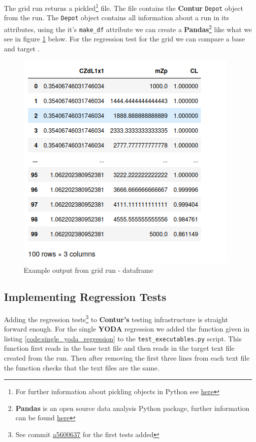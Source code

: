 The grid run returns a pickled\footnote{For further information about pickling objects in Python see \href{https://docs.python.org/3/library/pickle.html}{here}}  file. The  file contains the \textbf{Contur} \texttt{Depot} object from the run. The \texttt{Depot} object contains all information about a run in its attributes, using the it's \texttt{make\_df} attribute we can create a \textbf{Pandas}\footnote{\textbf{Pandas} is an open source data analysis Python package, further information can be found \href{https://pandas.pydata.org}{here} }  like what we see in figure \ref{fig:contur_df_output} below. For the regression test for the grid we can compare a base and target .

\begin{figure}[H]
\centering
\includegraphics[scale=0.6]{plots/example_data_frame.png}
\caption{Example output from grid run - dataframe}
\label{fig:contur_df_output}
\end{figure}


\subsection{Implementing Regression Tests}
Adding the regression tests\footnote{See commit \href{https://gitlab.com/hepcedar/contur/-/commit/a56006379872ee45c6b7689ce3aeea8ab8fd7435}{a5600637} for the first tests added} to \textbf{Contur's} testing infrastructure is straight forward enough. For the single \textbf{YODA} regression we added the function given in listing \ref{code:single_yoda_regression} to the \texttt{test\_executables.py} script. This function first reads in the base text file and then reads in the target text file created from the run. Then after removing the first three lines from each text file the function checks that the text files are the same.

